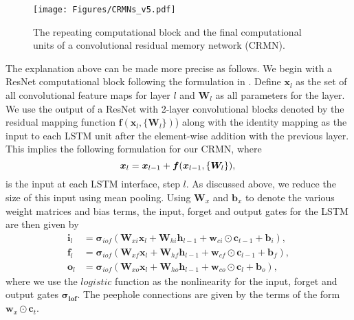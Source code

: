 \documentclass{article}
\begin{document}
\begin{figure}[htbp]
  \centering
    \texttt{[image: Figures/CRMNs\_v5.pdf]}
  \caption[The CRMN architecture]{The repeating computational block and the final computational units of a convolutional residual memory network (CRMN).}
  \label{fig:monorail}
\end{figure}



The explanation above can be made more precise as follows. We begin with a ResNet computational block following the formulation in \cite{he2015deep}. Define $\boldsymbol{x}_l$ as the set of all convolutional feature maps for layer $l$ and $\boldsymbol{W}_l$ as all parameters for the layer. We use the output of a ResNet with 2-layer convolutional blocks denoted by the residual mapping function \(\boldsymbol{f}(\boldsymbol{x}_l, \{\boldsymbol{W}_l\})\)) along with the identity mapping as the input to each LSTM unit after the element-wise addition with the previous layer. This implies the following formulation for our CRMN, where
\begin{equation}
\boldsymbol{x}_l = \boldsymbol{x}_{l-1}+\boldsymbol{f}(\boldsymbol{x}_{l-1}, \{\boldsymbol{W}_l\}), \\
\end{equation}
is the input at each LSTM interface, step $l$. As discussed above, we reduce the size of this input using mean pooling. Using  $\boldsymbol{W}_x$ and $\boldsymbol{b}_x$ to denote the various weight matrices and bias terms, the input, forget and output gates for the LSTM are then given by
\begin{align}
\boldsymbol{i}_l &= \boldsymbol{\sigma}_{iof}(\boldsymbol{W}_{xi} \boldsymbol{x}_l  + \boldsymbol{W}_{hi} \boldsymbol{h}_{l-1} + \boldsymbol{w}_{ci} \odot \boldsymbol{c}_{t-1} + \boldsymbol{b}_i), \\
\boldsymbol{f}_l &= \boldsymbol{\sigma}_{iof}(\boldsymbol{W}_{xf} \boldsymbol{x}_l + \boldsymbol{W}_{hf} \boldsymbol{h}_{l-1}
       + \boldsymbol{w}_{cf}  \odot \boldsymbol{c}_{l-1} + \boldsymbol{b}_f), \\
       \boldsymbol{o}_l &= \boldsymbol{\sigma}_{iof}(\boldsymbol{W}_{xo} \boldsymbol{x}_l + \boldsymbol{W}_{ho} \boldsymbol{h}_{l-1} + \boldsymbol{w}_{co} \odot \boldsymbol{c}_l + \boldsymbol{b}_o),
\end{align}
where we use the \(logistic\) function as the nonlinearity for the input, forget and output gates \(\boldsymbol{\sigma_{iof}}\). %
The peephole connections are given by the terms of the form $\boldsymbol{w}_{x} \odot \boldsymbol{c}_t$.
\end{document}

